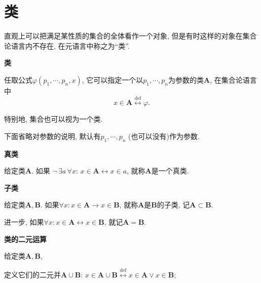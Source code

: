 


\setlength{\abovedisplayskip}{1pt}
\setlength{\belowdisplayskip}{1pt}

\section*{类}

直观上可以把满足某性质的集合的全体看作一个对象, 但是有时这样的对象在集合论语言内不存在,
在元语言中称之为``类''.

\vspace{10pt}

\hypertarget{sec:类}{}
\noindent\textbf{类}

任取公式$\varphi(p_1,\cdots,p_n,x)$,
它可以指定一个以$p_1,\cdots,p_n$为参数的类$\mathbf{A}$, 在集合论语言中
\vspace{3pt}
\[
    x\in\mathbf{A}\overset{\mathrm{def}}{\leftrightarrow}\varphi.
\]

特别地, 集合也可以视为一个类.

\vspace{10pt}

下面省略对参数的说明, 默认有$p_1,\cdots,p_n$ (也可以没有)作为参数.

\vspace{10pt}

\hypertarget{sec:真类}{}
\noindent\textbf{真类}

给定类$\mathbf{A}$. 如果
$\neg\,\exists a\,\forall x:\,x\in\mathbf{A}\leftrightarrow x\in a$,
就称$\mathbf{A}$是一个真类.

\vspace{10pt}

\hypertarget{sec:子类}{}
\noindent\textbf{子类}

给定类$\mathbf{A},\mathbf{B}$. 如果$\forall x:x\in\mathbf{A}\to x\in\mathbf{B}$,
就称$\mathbf{A}$是$\mathbf{B}$的子类, 记$\mathbf{A}\subset\mathbf{B}$.

进一步, 如果$\forall x:x\in\mathbf{A}\leftrightarrow x\in\mathbf{B}$,
就记$\mathbf{A}=\mathbf{B}$.

\vspace{10pt}

\hypertarget{sec:类的二元运算}{}
\noindent\textbf{类的二元运算}

给定类$\mathbf{A},\mathbf{B}$,

定义它们的二元并$\mathbf{A}\cup\mathbf{B}$:
$x\in\mathbf{A}\cup\mathbf{B}\overset{\mathrm{def}}{\leftrightarrow}
x\in\mathbf{A}\lor x\in\mathbf{B}$;

